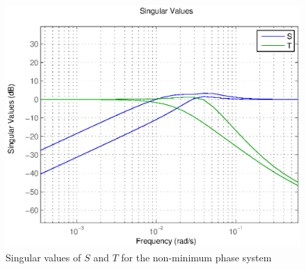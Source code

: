 \begin{figure}[h!t]
    \includegraphics[width=\columnwidth]{fig/ST322nm.eps}
    \caption{Singular values of $S$ and $T$ for the non-minimum phase system}
    \label{singnm}
\end{figure}

